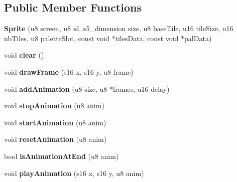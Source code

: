 \subsection*{Public Member Functions}
\begin{DoxyCompactItemize}
\item 
\hypertarget{classSprite_af2a7c9959b01ec19a7875ac42bc24f6a}{{\bfseries Sprite} (u8 screen, u8 id, s5\+\_\+dimension size, u8 base\+Tile, u16 tile\+Size, u16 nb\+Tiles, u8 palette\+Slot, const void $\ast$tiles\+Data, const void $\ast$pal\+Data)}\label{classSprite_af2a7c9959b01ec19a7875ac42bc24f6a}

\item 
\hypertarget{classSprite_a36b20b1988778637e82ea71b03f24c36}{void {\bfseries clear} ()}\label{classSprite_a36b20b1988778637e82ea71b03f24c36}

\item 
\hypertarget{classSprite_aefebc6e7c004bead1aa144a47980f0c0}{void {\bfseries draw\+Frame} (s16 x, s16 y, u8 frame)}\label{classSprite_aefebc6e7c004bead1aa144a47980f0c0}

\item 
\hypertarget{classSprite_a43b4b5a1024d4dbf16ff06c1ce88fa00}{void {\bfseries add\+Animation} (u8 size, u8 $\ast$frames, u16 delay)}\label{classSprite_a43b4b5a1024d4dbf16ff06c1ce88fa00}

\item 
\hypertarget{classSprite_a8fc89150457a37d78ae7974acc2441ed}{void {\bfseries stop\+Animation} (u8 anim)}\label{classSprite_a8fc89150457a37d78ae7974acc2441ed}

\item 
\hypertarget{classSprite_afba1a990e82eb6bf2c1786b273a2d8d6}{void {\bfseries start\+Animation} (u8 anim)}\label{classSprite_afba1a990e82eb6bf2c1786b273a2d8d6}

\item 
\hypertarget{classSprite_a8dfa9b2c4801fce3cac536bd155728c6}{void {\bfseries reset\+Animation} (u8 anim)}\label{classSprite_a8dfa9b2c4801fce3cac536bd155728c6}

\item 
\hypertarget{classSprite_a619b3a4fdd0453fbaad622d2dde9d0b4}{bool {\bfseries is\+Animation\+At\+End} (u8 anim)}\label{classSprite_a619b3a4fdd0453fbaad622d2dde9d0b4}

\item 
\hypertarget{classSprite_a101944b94b6259e176318ba492d5acc6}{void {\bfseries play\+Animation} (s16 x, s16 y, u8 anim)}\label{classSprite_a101944b94b6259e176318ba492d5acc6}

\end{DoxyCompactItemize}
